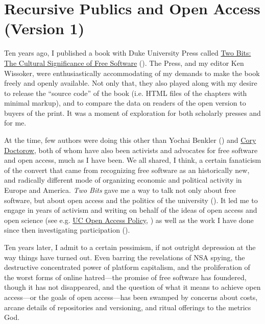 \documentclass[11pt]{article}
\author{Christopher Kelty}
\date{\today}
\title{}
\begin{document}
\section*{Recursive Publics and Open Access (Version 1)}
\label{sec:orge8931d4}
\maketitle
\onehalfspacing 

Ten years ago, I published a book with Duke University Press called \href{https://twobits.net/download/index.html}{Two Bits: The Cultural Significance of Free Software} (\cite{kelty2008twobits}). The Press, and my editor Ken Wissoker, were enthusiastically accommodating of my demands to make the book freely and openly available.  Not only that, they also played along with my desire to release the ``source code'' of the book (i.e. HTML files of the chapters with minimal markup), and to compare the data on readers of the open version to buyers of the print.  It was a moment of exploration for both scholarly presses and for me. 

At the time, few authors were doing this other than Yochai Benkler (\cite{benkler2007wealnetw}) and \href{https://craphound.com/}{Cory Doctorow}, both of whom have also been activists and advocates for free software and open access, much as I have been.  We all shared, I think, a certain fanaticism of the convert that came from recognizing free software as an historically new, and radically different mode of organizing economic and political activity in Europe and America. \emph{Two Bits} gave me a way to talk not only about free software, but about open access and the politics of the university (\cite{kelty2008anthincirc,kelty2014beyoncopytech}).  It led me to engage in years of activism and writing on behalf of the ideas of open access and open science (see e.g. \href{https://osc.universityofcalifornia.edu/open-access-policy/policy-history/}{UC Open Access Policy}, \cite{kelty_outlaw_2010}) as well as the work I have done since then investigating participation (\cite{fish2011birdinter,kelty2014sevendimen,kelty2018twomodespart}). 

Ten years later, I admit to a certain pessimism, if not outright depression at the way things have turned out.  Even barring the revelations of NSA spying, the destructive concentrated power of platform capitalism, and the proliferation of the worst forms of online hatred---the promise of free software has foundered, though it has not disappeared, and the question of what it means to achieve open access---or the goals of open access---has been swamped by concerns about costs, arcane details of repositories and versioning, and ritual offerings to the metrics God.  
\end{document}
